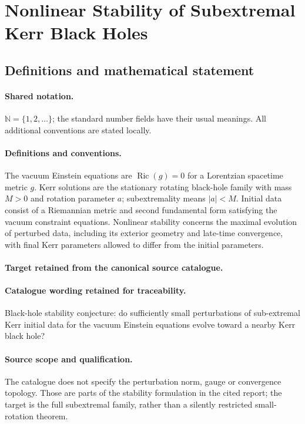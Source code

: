 \documentclass[11pt]{article}
\begin{document}
\section{Nonlinear Stability of Subextremal Kerr Black Holes}\label{statement}

\subsection{Definitions and mathematical statement}

\paragraph{Shared notation.}$\mathbb N=\{1,2,\ldots\}$; the standard number fields have their usual meanings. All additional conventions are stated locally.


\paragraph{Definitions and conventions.}
The vacuum Einstein equations are $\operatorname{Ric}(g)=0$ for a Lorentzian spacetime metric $g$. Kerr solutions are the stationary rotating black-hole family with mass $M>0$ and rotation parameter $a$; subextremality means $|a|<M$. Initial data consist of a Riemannian metric and second fundamental form satisfying the vacuum constraint equations. Nonlinear stability concerns the maximal evolution of perturbed data, including its exterior geometry and late-time convergence, with final Kerr parameters allowed to differ from the initial parameters.

\paragraph{Target retained from the canonical source catalogue.}
\paragraph{Catalogue wording retained for traceability.}
Black-hole stability conjecture: do sufficiently small perturbations of sub-extremal Kerr initial data for the vacuum Einstein equations evolve toward a nearby Kerr black hole?

\paragraph{Source scope and qualification.}
The catalogue does not specify the perturbation norm, gauge or convergence topology. Those are parts of the stability formulation in the cited report; the target is the full subextremal family, rather than a silently restricted small-rotation theorem.
\end{document}
